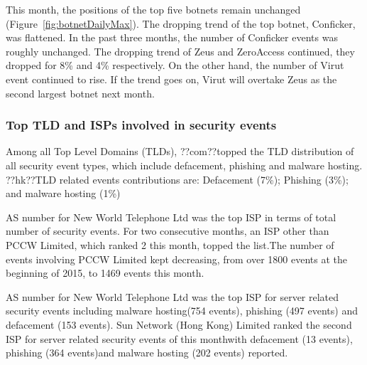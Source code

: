 \documentclass[__FONT_SIZE__]{extarticle}
\begin{document}
This month, the positions of the top five botnets remain unchanged (Figure~\ref{fig:botnetDailyMax}).
The dropping trend of the top botnet, Conficker, was flattened. In the past three months, the number of Conficker events was roughly unchanged.
The dropping trend of Zeus and ZeroAccess continued, they dropped for 8\% and 4\% respectively. On the other hand, the number of Virut event continued to rise. If the trend goes on, Virut will overtake Zeus as the second largest botnet next month.
\FloatBarrier
\subsubsection*{Top TLD and ISPs involved in security events}
Among all Top Level Domains (TLDs), ??com??topped the TLD distribution of all security event types, which include defacement, phishing and malware hosting.
??hk??TLD related events contributions are: Defacement (7\%); Phishing (3\%); and malware hosting (1\%)

AS number for New World Telephone Ltd was the top ISP in terms of total number of security events. For two consecutive months, an ISP other than PCCW Limited, which ranked 2 this month, topped the list.The number of events involving PCCW Limited kept decreasing, from over 1800 events at the beginning of 2015, to 1469 events this month.

AS number for New World Telephone Ltd was the top ISP for server related security events including malware hosting(754 events), phishing (497 events) and defacement (153 events).
Sun Network (Hong Kong) Limited ranked the second ISP for server related security events of this monthwith defacement (13 events), phishing (364 events)and malware hosting (202 events) reported.
\pagebreak
\FloatBarrier
\end{document}
